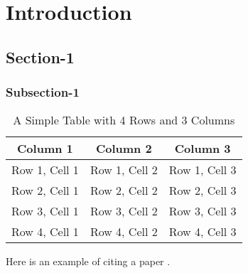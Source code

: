 \chapter{Introduction}\label{Chapter_1}
\section{Section-1}
\lipsum[1-5] %
\subsection{Subsection-1}
\lipsum[1-2]
\begin{table}[ht]
  \centering
 \renewcommand{\arraystretch}{2}
  \begin{tabular}{|c|c|c|}
    \hline
    \textbf{Column 1} & \textbf{Column 2} & \textbf{Column 3} \\
    \hline
    Row 1, Cell 1 & Row 1, Cell 2 & Row 1, Cell 3 \\
    \hline
    Row 2, Cell 1 & Row 2, Cell 2 & Row 2, Cell 3 \\
    \hline
    Row 3, Cell 1 & Row 3, Cell 2 & Row 3, Cell 3 \\
    \hline
    Row 4, Cell 1 & Row 4, Cell 2 & Row 4, Cell 3 \\
    \hline
  \end{tabular}
  \caption{A Simple Table with 4 Rows and 3 Columns}
  \label{tab:simple-table} 
\end{table}

Here is an example of citing a paper \cite{sweinberg1989}.
\lipsum[1-3] %